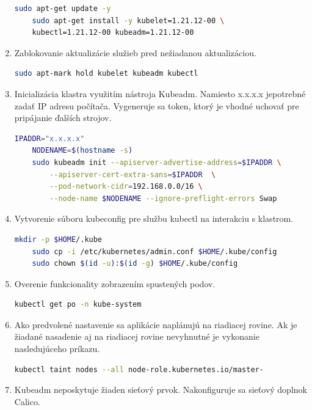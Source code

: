 \begin{enumerate}
{\begin{lstlisting}[language=Bash,basicstyle=\footnotesize]
    sudo apt-get update -y
    sudo apt-get install -y kubelet=1.21.12-00 \
    kubectl=1.21.12-00 kubeadm=1.21.12-00
\end{lstlisting}}
\item{\noindent Zablokovanie aktualizácie služieb pred nežiadanou aktualizáciou.
\begin{lstlisting}[language=Bash,basicstyle=\footnotesize]
    sudo apt-mark hold kubelet kubeadm kubectl
\end{lstlisting}}
\item{\noindent Inicializácia klastra využitím nástroja Kubeadm. Namiesto x.x.x.x je\br potrebné zadať IP adresu počítača. Vygeneruje sa token, ktorý je vhodné uchovať pre pripájanie ďalších strojov.
\begin{lstlisting}[language=Bash,basicstyle=\footnotesize]
    IPADDR="x.x.x.x"
    NODENAME=$(hostname -s)
    sudo kubeadm init --apiserver-advertise-address=$IPADDR \
        --apiserver-cert-extra-sans=$IPADDR  \
        --pod-network-cidr=192.168.0.0/16 \
        --node-name $NODENAME --ignore-preflight-errors Swap
\end{lstlisting}}
\item{\noindent Vytvorenie súboru kubeconfig pre službu kubectl na interakciu s klastrom.
\begin{lstlisting}[language=Bash,basicstyle=\footnotesize]
    mkdir -p $HOME/.kube
    sudo cp -i /etc/kubernetes/admin.conf $HOME/.kube/config
    sudo chown $(id -u):$(id -g) $HOME/.kube/config
\end{lstlisting}}
\item{\noindent Overenie funkcionality zobrazením spustených podov.
\begin{lstlisting}[language=Bash,basicstyle=\footnotesize]
    kubectl get po -n kube-system
\end{lstlisting}}
\item{\noindent Ako predvolené nastavenie sa aplikácie naplánujú na riadiacej rovine. Ak je žiadané nasadenie aj na riadiacej rovine nevyhnutné je vykonanie nasledujúceho príkazu.
\begin{lstlisting}[language=Bash,basicstyle=\footnotesize]
    kubectl taint nodes --all node-role.kubernetes.io/master-
\end{lstlisting}}
\item{\noindent Kubeadm neposkytuje žiaden sieťový prvok. Nakonfiguruje sa sieťový doplnok Calico.
\begin{lstlisting}[language=Bash,basicstyle=\footnotesize]

\end{lstlisting}}
\end{enumerate}
